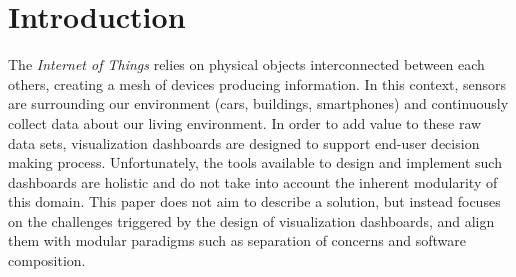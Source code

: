 \documentclass{acm_proc_article-sp}
\begin{document}
\section{Introduction}

The \emph{Internet of Things} relies on physical objects interconnected
between each others, creating a mesh of devices producing
information. In this context, sensors are surrounding our environment
(\eg cars, buildings, smartphones) and continuously collect data about
our living environment. In order to add value to these raw data sets,
visualization dashboards are designed to support end-user decision
making process. Unfortunately, the tools available to design and
implement such dashboards are holistic and do not take into account
the inherent modularity of this domain. This paper does not aim to
describe a solution, but instead focuses on the challenges triggered
by the design of visualization dashboards, and align them with
modular paradigms such as separation of concerns and software
composition.

\end{document}
